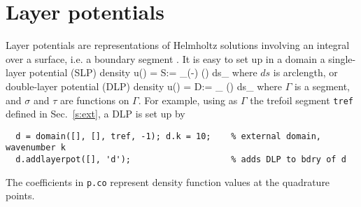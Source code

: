 \section{Layer potentials}

Layer potentials are representations of Helmholtz solutions
involving an integral over a surface, i.e. a boundary segment
\cite{coltonkress}.
It is easy to set up in a domain a single-layer potential (SLP) density
\be
u(\bx) = {\cal S}\sigma := \int_\Gamma \Phi(\bx-\by) \sigma(\by) ds_\by
\ee
where $ds$ is arclength, or double-layer potential (DLP) density
\be
u(\bx) = {\cal D}\tau := \int_\Gamma {} \tau(\by) ds_\by
\ee
where $\Gamma$ is a segment, and $\sigma$ and $\tau$ are functions on $\Gamma$.
For example, using as $\Gamma$ the
trefoil segment {\tt tref} defined in Sec.~\ref{s:ext}, a DLP is set up
by
\begin{verbatim}
  d = domain([], [], tref, -1); d.k = 10;    % external domain, wavenumber k
  d.addlayerpot([], 'd');                    % adds DLP to bdry of d
\end{verbatim}

The coefficients in {\tt p.co} represent density function values
at the quadrature points.
